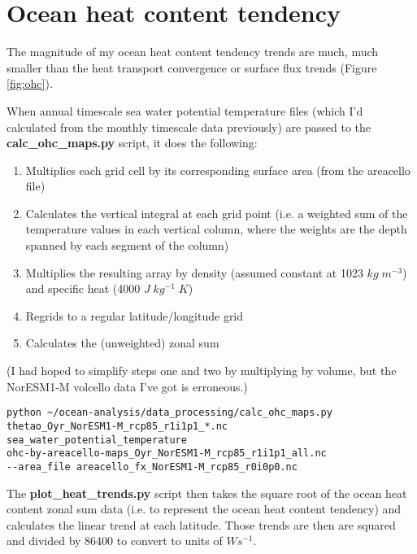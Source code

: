 \section{Ocean heat content tendency}

The magnitude of my ocean heat content tendency trends are much, much smaller than the heat transport convergence or surface flux trends (Figure \ref{fig:ohc}). 

When annual timescale sea water potential temperature files (which I'd calculated from the monthly timescale data previously) are passed to the \textbf{calc_ohc_maps.py} script, it does the following:
\begin{enumerate}
\item Multiplies each grid cell by its corresponding surface area (from the areacello file)
\item Calculates the vertical integral at each grid point (i.e. a weighted sum of the temperature values in each vertical column, where the weights are the depth spanned by each segment of the column)
\item Multiplies the resulting array by density (assumed constant at 1023 $kg\; m^{-3}$) and specific heat (4000 $J\; kg^{-1}\; K$)
\item Regrids to a regular latitude/longitude grid
\item Calculates the (unweighted) zonal sum
\end{enumerate}

(I had hoped to simplify steps one and two by multiplying by volume, but the NorESM1-M volcello data I've got is erroneous.) 

\begin{verbatim}
python ~/ocean-analysis/data_processing/calc_ohc_maps.py 
thetao_Oyr_NorESM1-M_rcp85_r1i1p1_*.nc 
sea_water_potential_temperature 
ohc-by-areacello-maps_Oyr_NorESM1-M_rcp85_r1i1p1_all.nc 
--area_file areacello_fx_NorESM1-M_rcp85_r0i0p0.nc
\end{verbatim}

The \textbf{plot_heat_trends.py} script then takes the square root of the ocean heat content zonal sum data (i.e. to represent the ocean heat content tendency) and calculates the linear trend at each latitude. Those trends are then are squared and divided by 86400 to convert to units of $Ws^{-1}$. 
